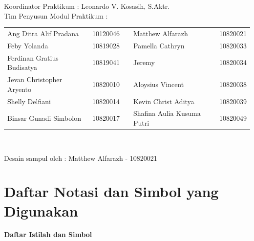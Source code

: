 \documentclass[
]{book}
\begin{document}
\begin{tcolorbox}[colback=blue!5!white,colframe=blue!75!black,title = Tim Praktikum AK2281]
\normalsize Koordinator Praktikum : Leonardo V. Kosasih, S.Aktr. \\
Tim Penyusun Modul Praktikum :
\begin{center}
\begin{tabular}{ lcclc }
Ang Ditra Alif Pradana & 10120046 & & Matthew Alfarazh & 10820021\\
Feby Yolanda & 10819028 & & Pamella Cathryn & 10820033\\
Ferdinan Gratius Budisatya & 10819041 & &Jeremy & 10820034\\
Jevan Christopher Aryento & 10820010 & &Aloysius Vincent & 10820038\\
Shelly Delfiani & 10820014 & &Kevin Christ Aditya & 10820039\\ 
Binsar Gunadi Simbolon & 10820017 & &Shafina Aulia Kusuma Putri & 10820049 \\
\end{tabular} \\
\end{center}
Desain sampul oleh : Matthew Alfarazh - 10820021
\end{tcolorbox}

\hypertarget{daftar-notasi-dan-simbol-yang-digunakan}{%
\section*{Daftar Notasi dan Simbol yang Digunakan}\label{daftar-notasi-dan-simbol-yang-digunakan}}

\large \textbf{Daftar Istilah dan Simbol} \normalsize  
\end{document}
